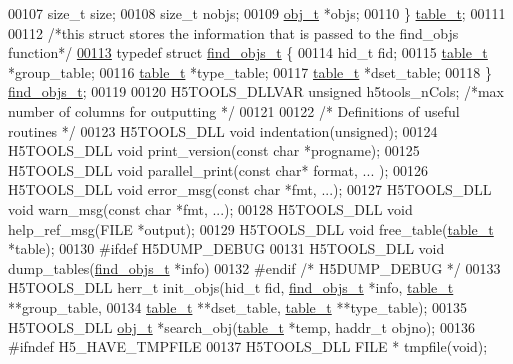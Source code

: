 \begin{DoxyCode}
00107     \textcolor{keywordtype}{size\_t} size;
00108     \textcolor{keywordtype}{size\_t} nobjs;
00109     \hyperlink{structobj__t}{obj\_t} *objs;
00110 \} \hyperlink{structtable__t}{table\_t};
00111 
00112 \textcolor{comment}{/*this struct stores the information that is passed to the find\_objs function*/}
\hyperlink{structfind__objs__t}{00113} \textcolor{keyword}{typedef} \textcolor{keyword}{struct }\hyperlink{structfind__objs__t}{find\_objs\_t} \{
00114     hid\_t fid;
00115     \hyperlink{structtable__t}{table\_t} *group\_table;
00116     \hyperlink{structtable__t}{table\_t} *type\_table;
00117     \hyperlink{structtable__t}{table\_t} *dset\_table;
00118 \} \hyperlink{structfind__objs__t}{find\_objs\_t};
00119 
00120 H5TOOLS\_DLLVAR \textcolor{keywordtype}{unsigned} h5tools\_nCols;               \textcolor{comment}{/*max number of columns for outputting  */}
00121 
00122 \textcolor{comment}{/* Definitions of useful routines */}
00123 H5TOOLS\_DLL \textcolor{keywordtype}{void}     indentation(\textcolor{keywordtype}{unsigned});
00124 H5TOOLS\_DLL \textcolor{keywordtype}{void}     print\_version(\textcolor{keyword}{const} \textcolor{keywordtype}{char} *progname);
00125 H5TOOLS\_DLL \textcolor{keywordtype}{void}     parallel\_print(\textcolor{keyword}{const} \textcolor{keywordtype}{char}* format, ... );
00126 H5TOOLS\_DLL \textcolor{keywordtype}{void}     error\_msg(\textcolor{keyword}{const} \textcolor{keywordtype}{char} *fmt, ...);
00127 H5TOOLS\_DLL \textcolor{keywordtype}{void}     warn\_msg(\textcolor{keyword}{const} \textcolor{keywordtype}{char} *fmt, ...);
00128 H5TOOLS\_DLL \textcolor{keywordtype}{void}     help\_ref\_msg(FILE *output);
00129 H5TOOLS\_DLL \textcolor{keywordtype}{void}     free\_table(\hyperlink{structtable__t}{table\_t} *table);
00130 \textcolor{preprocessor}{#ifdef H5DUMP\_DEBUG}
00131 H5TOOLS\_DLL \textcolor{keywordtype}{void}     dump\_tables(\hyperlink{structfind__objs__t}{find\_objs\_t} *info)
00132 \textcolor{preprocessor}{#endif  }\textcolor{comment}{/* H5DUMP\_DEBUG */}\textcolor{preprocessor}{}
00133 H5TOOLS\_DLL herr\_t init\_objs(hid\_t fid, \hyperlink{structfind__objs__t}{find\_objs\_t} *info, \hyperlink{structtable__t}{table\_t} **group\_table,
00134     \hyperlink{structtable__t}{table\_t} **dset\_table, \hyperlink{structtable__t}{table\_t} **type\_table);
00135 H5TOOLS\_DLL \hyperlink{structobj__t}{obj\_t}   *search\_obj(\hyperlink{structtable__t}{table\_t} *temp, haddr\_t objno);
00136 \textcolor{preprocessor}{#ifndef H5\_HAVE\_TMPFILE}
00137 H5TOOLS\_DLL FILE *  tmpfile(\textcolor{keywordtype}{void});

\end{DoxyCode}
